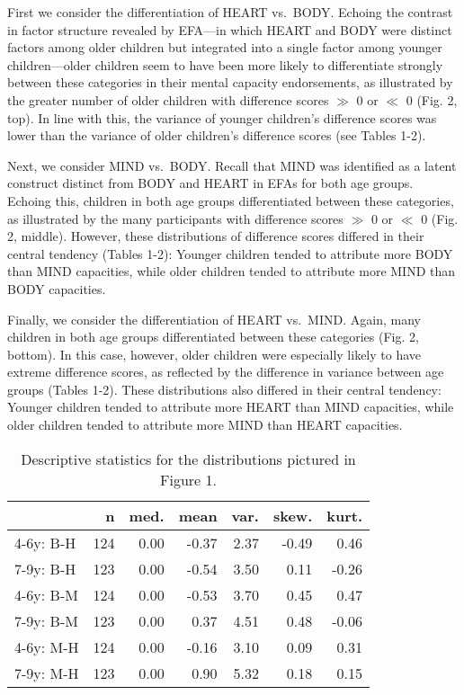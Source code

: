 \documentclass[10pt, letterpaper]{article}
\begin{document}
First we consider the differentiation of HEART vs.~BODY. Echoing the
contrast in factor structure revealed by EFA---in which HEART and BODY
were distinct factors among older children but integrated into a single
factor among younger children---older children seem to have been more
likely to differentiate strongly between these categories in their
mental capacity endorsements, as illustrated by the greater number of
older children with difference scores \(\gg\) 0 or \(\ll\) 0 (Fig. 2,
top). In line with this, the variance of younger children's difference
scores was lower than the variance of older children's difference scores
(see Tables 1-2).

Next, we consider MIND vs.~BODY. Recall that MIND was identified as a
latent construct distinct from BODY and HEART in EFAs for both age
groups. Echoing this, children in both age groups differentiated between
these categories, as illustrated by the many participants with
difference scores \(\gg\) 0 or \(\ll\) 0 (Fig. 2, middle). However,
these distributions of difference scores differed in their central
tendency (Tables 1-2): Younger children tended to attribute more BODY
than MIND capacities, while older children tended to attribute more MIND
than BODY capacities.

Finally, we consider the differentiation of HEART vs.~MIND. Again, many
children in both age groups differentiated between these categories
(Fig. 2, bottom). In this case, however, older children were especially
likely to have extreme difference scores, as reflected by the difference
in variance between age groups (Tables 1-2). These distributions also
differed in their central tendency: Younger children tended to attribute
more HEART than MIND capacities, while older children tended to
attribute more MIND than HEART capacities.

\begin{table}[ht]
\centering
\begin{tabular}{l|rrrrrr}
  \hline
 & n & med. & mean & var. & skew. & kurt. \\ 
  \hline
4-6y: B-H & 124 & 0.00 & -0.37 & 2.37 & -0.49 & 0.46 \\ 
  7-9y: B-H & 123 & 0.00 & -0.54 & 3.50 & 0.11 & -0.26 \\ 
  4-6y: B-M & 124 & 0.00 & -0.53 & 3.70 &  0.45 & 0.47 \\ 
  7-9y: B-M & 123 & 0.00 &  0.37 & 4.51 & 0.48 & -0.06 \\ 
  4-6y: M-H & 124 & 0.00 & -0.16 & 3.10 &  0.09 & 0.31 \\ 
  7-9y: M-H & 123 & 0.00 &  0.90 & 5.32 & 0.18 &  0.15 \\ 
   \hline
\end{tabular}
\caption{Descriptive statistics for the distributions pictured in Figure 1.} 
\end{table}
\end{document}
